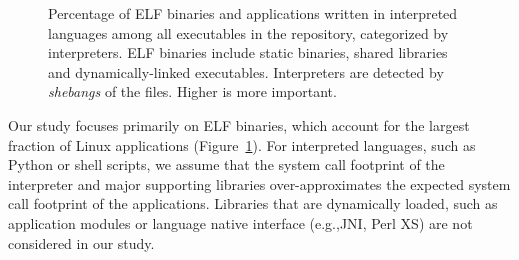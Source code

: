 \begin{figure}[t!]
\footnotesize
\caption[Types of executables included in the study of Linux API usage.]
{Percentage of ELF binaries and applications written in interpreted languages among all executables in the \osdist{} repository, categorized by interpreters. ELF binaries include static binaries, shared libraries and dynamically-linked executables. Interpreters are detected by {\em shebangs} of the files. Higher is more important.}
\label{fig:syspop:executable-type}
\end{figure}

Our study focuses primarily on ELF binaries, which account for the largest fraction of Linux applications
(Figure~\ref{fig:syspop:executable-type}).
For interpreted languages, such as Python or shell scripts,
we assume that the system call footprint of the interpreter and major supporting libraries over-approximates the expected system call footprint of the applications.
Libraries that are dynamically loaded, such as application modules or
language native interface (e.g.,JNI, Perl XS) are not considered in our study. 


